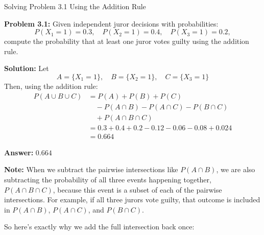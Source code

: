 \documentclass{article}
\begin{document}
\begin{center}
    \Large  Solving Problem 3.1 Using the Addition Rule
\end{center}
\vspace{2em}

\textbf{Problem 3.1:} Given independent juror decisions with probabilities:
\[
P(X_1 = 1) = 0.3,\quad P(X_2 = 1) = 0.4,\quad P(X_3 = 1) = 0.2,
\]
compute the probability that at least one juror votes guilty using the addition rule.

\textbf{Solution:} Let
\[
A = \{X_1 = 1\},\quad B = \{X_2 = 1\},\quad C = \{X_3 = 1\}
\]
Then, using the addition rule:
\[
\begin{aligned}
P(A \cup B \cup C) &= P(A) + P(B) + P(C) \\
&\quad - P(A \cap B) - P(A \cap C) - P(B \cap C) \\
&\quad + P(A \cap B \cap C) \\
&= 0.3 + 0.4 + 0.2 - 0.12 - 0.06 - 0.08 + 0.024 \\
&= 0.664
\end{aligned}
\]

\textbf{Answer:} \( \boxed{0.664} \)

\textbf{Note:} When we subtract the pairwise intersections like \( P(A \cap B) \), we are also subtracting the probability of all three events happening together, \( P(A \cap B \cap C) \), because this event is a subset of each of the pairwise intersections. For example, if all three jurors vote guilty, that outcome is included in \( P(A \cap B) \), \( P(A \cap C) \), and \( P(B \cap C) \). 

So here’s exactly why we add the full intersection back once:
\end{document}
